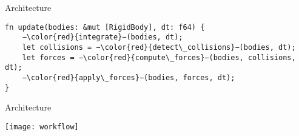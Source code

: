 \begin{frame}[fragile]{Architecture}
\begin{lstlisting}
fn update(bodies: &mut [RigidBody], dt: f64) {
    −\color{red}{integrate}−(bodies, dt);
    let collisions = −\color{red}{detect\_collisions}−(bodies, dt);
    let forces = −\color{red}{compute\_forces}−(bodies, collisions, dt);
    −\color{red}{apply\_forces}−(bodies, forces, dt);
}
\end{lstlisting}

\end{frame}

\begin{frame}[fragile]{Architecture}
\vfill
\begin{center}
\texttt{[image: workflow]}
\end{center}
\vfill
\end{frame}
